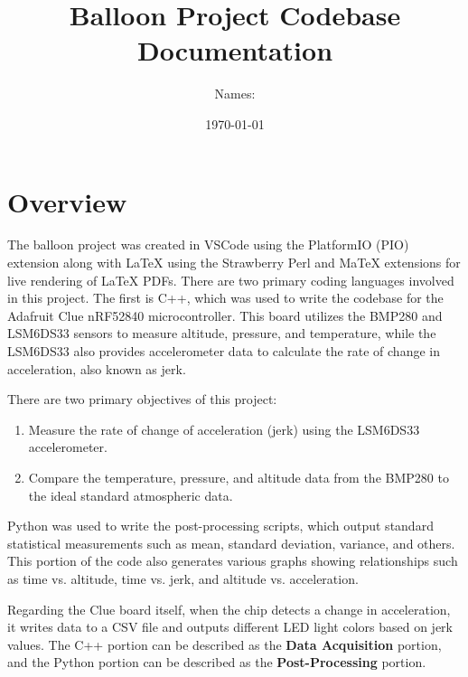 \documentclass[12pt]{report}
\title{Balloon Project Codebase Documentation}
\author{Names:}
\date{\today}
\begin{document}
\maketitle

\tableofcontents



\chapter*{Overview}

The balloon project was created in VSCode using the PlatformIO (PIO) extension along with LaTeX using the Strawberry Perl and MaTeX extensions for live rendering of LaTeX PDFs. There are two primary coding languages involved in this project. The first is C++, which was used to write the codebase for the Adafruit Clue nRF52840 microcontroller. This board utilizes the BMP280 and LSM6DS33 sensors to measure altitude, pressure, and temperature, while the LSM6DS33 also provides accelerometer data to calculate the rate of change in acceleration, also known as jerk. \newline

There are two primary objectives of this project:

\begin{enumerate}
    \item Measure the rate of change of acceleration (jerk) using the LSM6DS33 accelerometer.
    \item Compare the temperature, pressure, and altitude data from the BMP280 to the ideal standard atmospheric data.
\end{enumerate}

Python was used to write the post-processing scripts, which output standard statistical measurements such as mean, standard deviation, variance, and others. This portion of the code also generates various graphs showing relationships such as time vs. altitude, time vs. jerk, and altitude vs. acceleration. \newline

Regarding the Clue board itself, when the chip detects a change in acceleration, it writes data to a CSV file and outputs different LED light colors based on jerk values. The C++ portion can be described as the \textbf{Data Acquisition} portion, and the Python portion can be described as the \textbf{Post-Processing} portion. \newline
\end{document}
